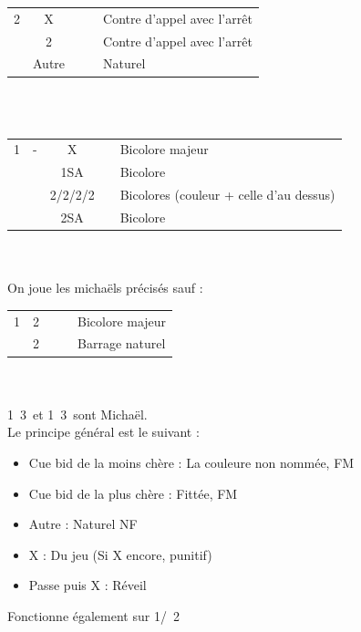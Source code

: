 \documentclass[a4paper, oneside, 11pt]{report}
\begin{document}
	\begin{tabular}{cccc|l}
	2\coeur & X &&& Contre d'appel avec l'arrêt \coeur\\
	& 2\pique &&& Contre d'appel avec l'arrêt \pique\\
	& Autre &&& Naturel\\
	\end{tabular}\\\\

	\begin{tabular}{cccc|l}
	1\trefle & -  & X && Bicolore majeur\\
	&& 1SA && Bicolore \coeur\trefle\\
	&& 2\trefle/2\carreau/2\coeur/2\pique && Bicolores (couleur + celle d'au dessus)\\
	&& 2SA && Bicolore \carreau\pique\\
	\end{tabular}\\\\

	On joue les michaëls précisés sauf :\\
		
	\begin{tabular}{cccc|l}
	1\trefle & 2\trefle &&& Bicolore majeur\\
	& 2\carreau &&& Barrage naturel\\
	\end{tabular}\\\\

	1\trefle\ 3\trefle\ et 1\carreau\ 3\trefle\ sont Michaël.\\

	Le principe général est le suivant :
	\begin{itemize}
	\item Cue bid de la moins chère : La couleure non nommée, FM
	\item Cue bid de la plus chère : Fittée, FM
	\item Autre : Naturel NF\\
	\item X : Du jeu (Si X encore, punitif)
	\item Passe puis X : Réveil\\
	\end{itemize}
	Fonctionne également sur 1\trefle/\carreau\ 2\carreau
\end{document}
